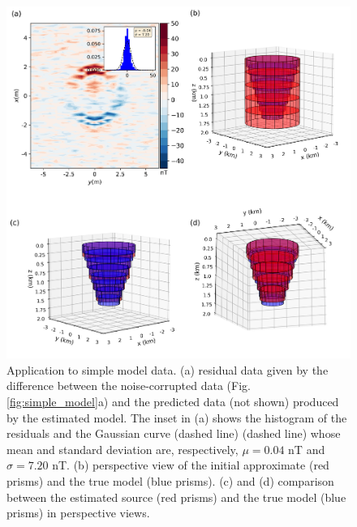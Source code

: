 \begin{figure}
	\centering
	\includegraphics[scale=.5]{figures/simple_results.png}
	\caption{Application to simple model data. (a) residual data given by the difference between the noise-corrupted data (Fig. \ref{fig:simple_model}a) and the predicted data (not shown) produced by the estimated model. The inset in (a) shows the histogram of the residuals and the Gaussian curve (dashed line) (dashed line) whose mean and standard deviation are, respectively, $\mu = 0.04$ nT and $\sigma=7.20$ nT. (b) perspective view of the initial approximate (red prisms) and the true model (blue prisms). (c) and (d) comparison between the estimated source (red prisms) and the true model (blue prisms) in perspective views.
	}
	\label{fig:simple_results}
\end{figure}


